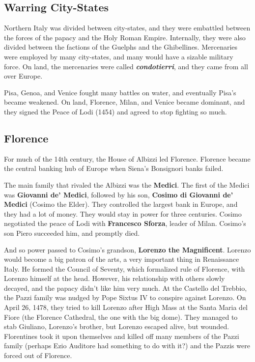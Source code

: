 \subsection*{Warring City-States}

Northern Italy was divided between city-states,
and they were embattled between the forces of the papacy and the Holy Roman Empire.
Internally, they were also divided between the factions of the Guelphs and the Ghibellines.
Mercenaries were employed by many city-states, and many would have a sizable military force.
On land, the mercenaries were called \textit{\textbf{condotierri}}, and they came from all over Europe.

Pisa, Genoa, and Venice fought many battles on water, and eventually Pisa's became weakened.
On land, Florence, Milan, and Venice became dominant,
and they signed the Peace of Lodi (1454) and agreed to stop fighting so much.

\subsection*{Florence}

For much of the 14th century, the House of Albizzi led Florence.
Florence became the central banking hub of Europe when Siena's Bonsignori banks failed.

The main family that rivaled the Albizzi was the \textbf{Medici}.
The first of the Medici was \textbf{Giovanni de' Medici},
followed by his son, \textbf{Cosimo di Giovanni de' Medici} (Cosimo the Elder).
They controlled the largest bank in Europe, and they had a lot of money.
They would stay in power for three centuries.
Cosimo negotiated the peace of Lodi with \textbf{Francesco Sforza}, leader of Milan.
Cosimo's son Piero succeeded him, and promptly died.

And so power passed to Cosimo's grandson, \textbf{Lorenzo the Magnificent}.
Lorenzo would become a big patron of the arts, a very important thing in Renaissance Italy.
He formed the Council of Seventy, which formalized rule of Florence, with Lorenzo himself at the head.
However, his relationship with others slowly decayed, and the papacy didn't like him very much.
At the Castello del Trebbio, the Pazzi family was nudged by Pope Sixtus IV to conspire against Lorenzo.
On April 26, 1478, they tried to kill Lorenzo after High Mass at the Santa Maria del Fiore
(the Florence Cathedral, the one with the big dome).
They managed to stab Giuliano, Lorenzo's brother, but Lorenzo escaped alive, but wounded.
Florentines took it upon themselves and killed off many members of the Pazzi family
(perhaps Ezio Auditore had something to do with it?)
and the Pazzis were forced out of Florence.


